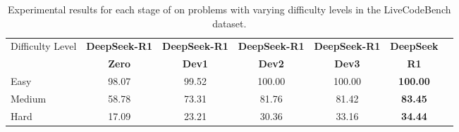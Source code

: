 \begin{table}[h]
    \centering
    \footnotesize
    \setlength{\tabcolsep}{1.9pt}
    \caption{ Experimental results for each stage of \dsri{} on  problems with varying difficulty levels in the LiveCodeBench dataset.}
    \begin{tabular}{l | c c  c  c |c c@{}}
    \toprule
    \multirow{2}{*}{Difficulty Level} & \textbf{DeepSeek-R1} & \textbf{DeepSeek-R1}  & \textbf{DeepSeek-R1}& \textbf{DeepSeek-R1} &  \textbf{DeepSeek}\\
    & \textbf{Zero}   & \textbf{Dev1}  & \textbf{Dev2} & \textbf{Dev3} & \textbf{R1} \\
    \midrule
     Easy   & 98.07 & 99.52&100.00 & 100.00  &   \textbf{100.00} \\
     Medium   & 58.78 & 73.31&81.76 & 81.42  &   \textbf{83.45} \\
     Hard   & 17.09 & 23.21&30.36 & 33.16  &   \textbf{34.44} \\
    \midrule

    \end{tabular}
    
    \label{tab:difficulty_lcb}
\end{table}



